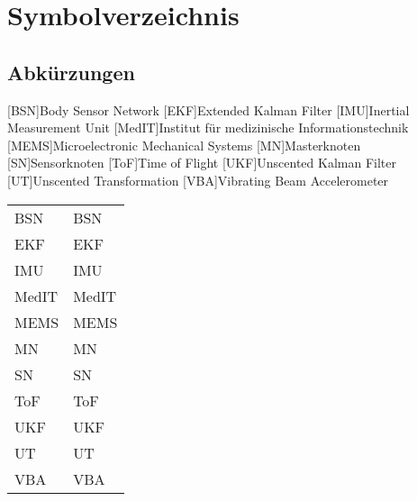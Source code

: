 \chapter*{Symbolverzeichnis}										%



\section*{Abkürzungen}


[BSN]{Body Sensor Network}
[EKF]{Extended Kalman Filter}
[IMU]{Inertial Measurement Unit}
[MedIT]{Institut f{\"u}r medizinische Informationstechnik}
[MEMS]{Microelectronic Mechanical Systems}
[MN]{Masterknoten}
[SN]{Sensorknoten}
[ToF]{Time of Flight}
[UKF]{Unscented Kalman Filter}
[UT]{Unscented Transformation}
[VBA]{Vibrating Beam Accelerometer}



\begin{tabularx}{\textwidth}{p{}X}
\acs{BSN} & \acl{BSN} \\
\acs{EKF} & \acl{EKF} \\
\acs{IMU} &\acl{IMU} \\
\acs{MedIT} & \acl{MedIT} \\
\acs{MEMS} & \acl{MEMS} \\
\acs{MN} & \acl{MN} \\
\acs{SN} & \acl{SN} \\
\acs{ToF} & \acl{ToF} \\
\acs{UKF} & \acl{UKF} \\
\acs{UT} & \acl{UT} \\
\acs{VBA} & \acl{VBA} \\
\end{tabularx}
